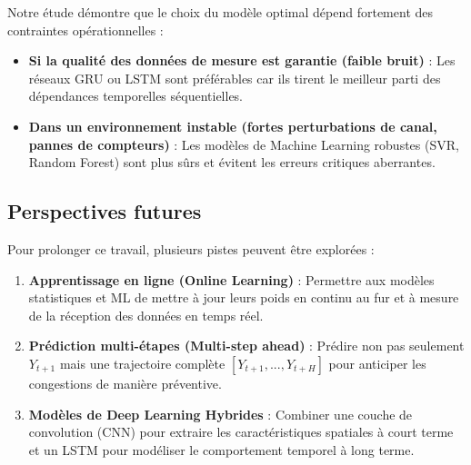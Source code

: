 \documentclass[11pt,a4paper]{article}
\begin{document}
Notre étude démontre que le choix du modèle optimal dépend fortement des contraintes opérationnelles :
\begin{itemize}
    \item \textbf{Si la qualité des données de mesure est garantie (faible bruit)} : Les réseaux GRU ou LSTM sont préférables car ils tirent le meilleur parti des dépendances temporelles séquentielles.
    \item \textbf{Dans un environnement instable (fortes perturbations de canal, pannes de compteurs)} : Les modèles de Machine Learning robustes (SVR, Random Forest) sont plus sûrs et évitent les erreurs critiques aberrantes.
\end{itemize}

\subsection{Perspectives futures}
Pour prolonger ce travail, plusieurs pistes peuvent être explorées :
\begin{enumerate}
    \item \textbf{Apprentissage en ligne (Online Learning)} : Permettre aux modèles statistiques et ML de mettre à jour leurs poids en continu au fur et à mesure de la réception des données en temps réel.
    \item \textbf{Prédiction multi-étapes (Multi-step ahead)} : Prédire non pas seulement $Y_{t+1}$ mais une trajectoire complète $[Y_{t+1}, ..., Y_{t+H}]$ pour anticiper les congestions de manière préventive.
    \item \textbf{Modèles de Deep Learning Hybrides} : Combiner une couche de convolution (CNN) pour extraire les caractéristiques spatiales à court terme et un LSTM pour modéliser le comportement temporel à long terme.
\end{enumerate}
\end{document}
